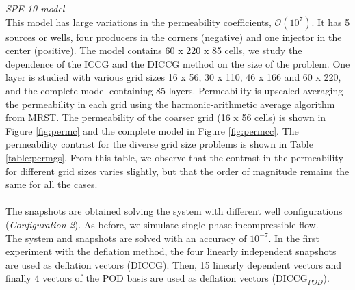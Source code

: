 \documentclass[12pt]{article}
\begin{document}
\newpage
\emph{SPE 10 model}\\
This model has large variations in the permeability coefficients, $\mathcal{O} (10^7)$.
It has 5 sources or wells, four producers in the corners (negative) and one injector in the center (positive).
The model contains 60 x 220 x 85 cells, we study the dependence of the ICCG and the DICCG method on the size of the problem. One layer is studied with various grid sizes 16 x 56, 30 x 110, 46 x 166 and 60 x 220, and the complete model containing 85 layers.
Permeability is upscaled
averaging the permeability in each grid using the harmonic-arithmetic average algorithm from MRST.
The permeability of the coarser grid (16 x 56 cells) is shown in Figure \ref{fig:permc} and the complete model in Figure \ref{fig:permcc}.
The permeability contrast for the diverse grid size problems is shown in Table \ref{table:permgs}. From this table, we observe that the contrast in the permeability for different grid sizes varies slightly, but that the order
of magnitude remains the same for all the cases.\\
\\The snapshots are obtained solving the system with different well
configurations (\emph{Configuration 2}). As before, we simulate single-phase incompressible flow.\\
The system and snapshots are solved with an accuracy of $10^{-7}$.
In the first experiment with the deflation method, the four linearly independent snapshots are used as deflation vectors (DICCG). Then, 
15 linearly dependent vectors and finally 4 vectors of the POD basis are used as deflation vectors (DICCG$_{POD}$). \\ 
\end{document}
